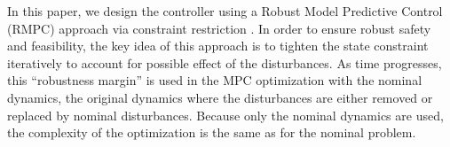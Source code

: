 
In this paper, we design the controller using a Robust Model Predictive
Control (RMPC) approach via constraint restriction \cite{richardsetal05rmp, chiscietal01swp}.
In order to ensure robust safety and feasibility, the key idea of
this approach is to tighten the state constraint iteratively to account
for possible effect of the disturbances. As time progresses, this ``robustness
margin'' is used in the MPC optimization with the nominal dynamics,
\ie the original dynamics where the disturbances are either removed
or replaced by nominal disturbances.
Because only the nominal dynamics are used, the complexity of the optimization is the same as for the nominal problem.

